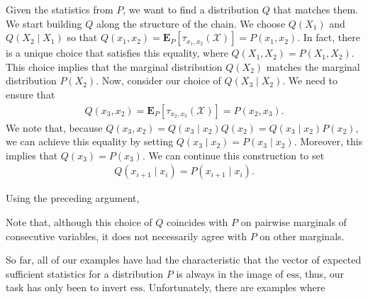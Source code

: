 \documentclass{article}
\begin{document}
\begin{exma}
Given the statistics from $P$, we want to find a distribution $Q$ that matches them. We start building $Q$ along the structure of the chain. We choose $Q\left(X_{1}\right)$ and $Q\left(X_{2} \mid X_{1}\right)$ so that $Q\left(x_{1}, x_{2}\right)=\boldsymbol{E}_{P}\left[\tau_{x_{1}, x_{2}}(\mathcal{X})\right]=P\left(x_{1}, x_{2}\right)$. In fact, there is a unique choice that satisfies this equality, where $Q\left(X_{1}, X_{2}\right)=P\left(X_{1}, X_{2}\right)$. This choice implies that the marginal distribution $Q\left(X_{2}\right)$ matches the marginal distribution $P\left(X_{2}\right) .$ Now, consider our choice of $Q\left(X_{3} \mid X_{2}\right)$. We need to ensure that
\begin{align*}
Q\left(x_{3}, x_{2}\right)=\boldsymbol{E}_{P}\left[\tau_{x_{2}, x_{3}}(\mathcal{X})\right]=P\left(x_{2}, x_{3}\right) .
\end{align*}
We note that, because $Q\left(x_{3}, x_{2}\right)=Q\left(x_{3} \mid x_{2}\right) Q\left(x_{2}\right)=Q\left(x_{3} \mid x_{2}\right) P\left(x_{2}\right)$, we can achieve this equality by setting $Q\left(x_{3} \mid x_{2}\right)=P\left(x_{3} \mid x_{2}\right)$. Moreover, this implies that $Q\left(x_{3}\right)=P\left(x_{3}\right)$. We can continue this construction  to set
\begin{align*}
Q\left(x_{i+1} \mid x_{i}\right)=P\left(x_{i+1} \mid x_{i}\right) .
\end{align*}

Using the preceding argument, 
\end{exma}
\begin{rema}
Note that, although this choice of $Q$ coincides with $P$ on pairwise marginals of consecutive variables, it does not necessarily agree with $P$ on other marginals.
\end{rema}
So far, all of our examples have had the characteristic that the vector of expected sufficient statistics for a distribution $P$ is always in the image of $\mathrm{ess}$, thus, our task has only been to invert $\mathrm{ess}$. Unfortunately, there are examples where 
\end{document}

